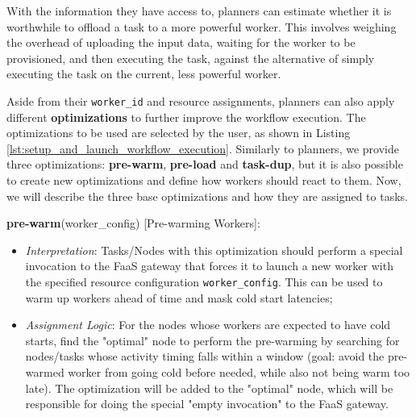 \documentclass[conference]{IEEEtran}
\begin{document}
With the information they have access to, planners can estimate whether it is worthwhile to offload a task to a more powerful worker. This involves weighing the overhead of uploading the input data, waiting for the worker to be provisioned, and then executing the task, against the alternative of simply executing the task on the current, less powerful worker.

Aside from their \texttt{worker\_id} and resource assignments, planners can also apply different \textbf{optimizations} to further improve the workflow execution. The optimizations to be used are selected by the user, as shown in Listing \ref{lst:setup_and_launch_workflow_execution}. Similarly to planners, we provide three optimizations: \textbf{pre-warm}, \textbf{pre-load} and \textbf{task-dup}, but it is also possible to create new optimizations and define how workers should react to them. Now, we will describe the three base optimizations and how they are assigned to tasks.

\textbf{pre-warm}(worker\_config) [Pre-warming Workers]:
\begin{itemize}
  \item \textit{Interpretation}: Tasks/Nodes with this optimization should perform a special invocation to the FaaS gateway that forces it to launch a new worker with the specified resource configuration \texttt{worker\_config}. This can be used to warm up workers ahead of time and mask cold start latencies;
  \item \textit{Assignment Logic}: For the nodes whose workers are expected to have cold starts, find the "optimal" node to perform the pre-warming by searching for nodes/tasks whose activity timing falls within a window (goal: avoid the pre-warmed worker from going cold before needed, while also not being warm too late). The optimization will be added to the "optimal" node, which will be responsible for doing the special "empty invocation" to the FaaS gateway.
\end{itemize}
\end{document}

